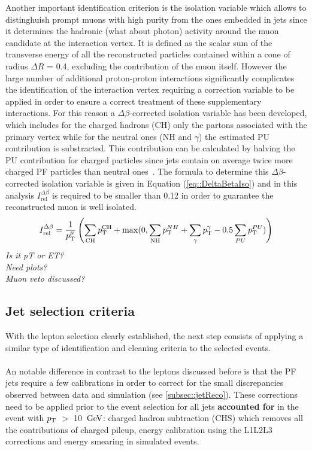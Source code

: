 Another important identification criterion is the isolation variable which allows to distinghuish prompt muons with high purity from the ones embedded in jets since it determines the hadronic (what about photon) activity around the muon candidate at the interaction vertex. %
It is defined as the scalar sum of the transverse energy of all the reconstructed particles contained within a cone of radius $\Delta R$ = 0.4, excluding the contribution of the muon itself.
However the large number of additional proton-proton interactions significantly complicates the identification of the interaction vertex requiring a correction variable to be applied in order to ensure a correct treatment of these supplementary interactions. 
For this reason a $\Delta \beta$-corrected isolation variable has been developed, which includes for the charged hadrons (CH) only the partons associated with the primary vertex while for the neutral ones (NH and $\gamma$) the estimated PU contribution is substracted. This contribution can be calculated by halving the PU contribution for charged particles since jets contain on average twice more charged PF particles than neutral ones~\cite{CHContrVsN}. The formula to determine this $\Delta \beta$-corrected isolation variable is given in Equation (\ref{eq::DeltaBetaIso}) and in this analysis $I_{\textrm{rel}}^{\Delta \beta}$ is required to be smaller than 0.12 in order to guarantee the reconstructed muon is well isolated.
\begin{equation}\label{eq::DeltaBetaIso}
 I_{\textrm{rel}}^{\Delta \beta} = \frac{1}{p_{\rm T}^{\mu}} \left( \sum_{\textrm{CH}} p_{\rm T}^{\textrm{CH}} + \max(0, \sum_{\textrm{NH}} p_{\rm T}^{NH} + \sum_{\gamma} p_{\rm T}^{\gamma} - 0.5 \sum_{PU} p_{\rm T}^{PU}) \right)
\end{equation}
\textit{Is it pT or ET?}\\
\textit{Need plots?}\\
\textit{Muon veto discussed?}

\subsection{Jet selection criteria}
With the lepton selection clearly established, the next step consists of applying a similar type of identification and cleaning criteria to the selected events.
\\
\\

An notable difference in contrast to the leptons discussed before is that the PF jets require a few calibrations in order to correct for the small discrepancies observed between data and simulation (see \ref{subsec::jetReco}). These corrections need to be applied prior to the event selection for all jets \textbf{accounted for} in the event with $p_{\rm T}$ $>$ 10 $\, \mathrm{GeV}$: charged hadron subtraction (CHS) which removes all the contributions of charged pileup, energy calibration using the L1L2L3 corrections and energy smearing in simulated events.
\\

